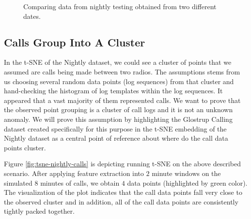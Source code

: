 \begin{figure}%
    \centering
    \qquad
    \caption{Comparing data from nightly testing obtained from two different dates.}%
    \label{fig:tsne-nights-comparison}%
\end{figure}


\subsection{Calls Group Into A Cluster}
\label{assumption-calls}
In the t-SNE of the Nightly dataset, we could see a cluster of points that we assumed are calls being made between two radios. The assumptions stems from us choosing several random data points (log sequences) from that cluster and hand-checking the histogram of log templates within the log sequences. It appeared that a vast majority of them represented calls. We want to prove that the observed point grouping is a cluster of call logs and it is not an unknown anomaly. We will prove this assumption by highlighting the Glostrup Calling dataset created specifically for this purpose in the t-SNE embedding of the Nightly dataset as a central point of reference about where do the call data points cluster.

Figure \ref{fig:tsne-nightly-calls} is depicting running t-SNE on the above described scenario. After applying feature extraction into $2$ minute windows on the simulated $8$ minutes of calls, we obtain $4$ data points (highlighted by green color). The visualization of the plot indicates that the call data points fall very close to the observed cluster and in addition, all of the call data points are consistently tightly packed together. 


